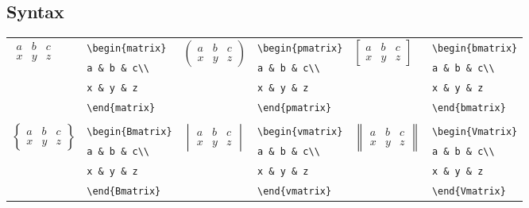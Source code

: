 \documentclass[10pt, english]{article}
\begin{document}
	\subsection{Syntax}

	\begin{center}
		\scriptsize
	\begin{tabular}{ll|ll|ll}
		\multirow{4}{*}{$\begin{matrix}a&b&c\\x&y&z\end{matrix}$} & \verb|\begin{matrix}| & \multirow{4}{*}{$\begin{pmatrix}a&b&c\\x&y&z\end{pmatrix}$} & \verb|\begin{pmatrix}| & \multirow{4}{*}{$\begin{bmatrix}a&b&c\\x&y&z\end{bmatrix}$} & \verb|\begin{bmatrix}|\\ 
		& \verb|a & b & c\\| & & \verb|a & b & c\\| & & \verb|a & b & c\\|\\ 
		& \verb|x & y & z| & & \verb|x & y & z| & & \verb|x & y & z|\\ 
		& \verb|\end{matrix}| & & \verb|\end{pmatrix}| & & \verb|\end{bmatrix}|\\
		\multicolumn{2}{l|}{} & \multicolumn{2}{l|}{} & \multicolumn{2}{l}{}\\
                \multirow{4}{*}{$\begin{Bmatrix}a&b&c\\x&y&z\end{Bmatrix}$} & \verb|\begin{Bmatrix}| & \multirow{4}{*}{$\begin{vmatrix}a&b&c\\x&y&z\end{vmatrix}$} & \verb|\begin{vmatrix}| & \multirow{4}{*}{$\begin{Vmatrix}a&b&c\\x&y&z\end{Vmatrix}$} & \verb|\begin{Vmatrix}|\\
                & \verb|a & b & c\\| & & \verb|a & b & c\\| & & \verb|a & b & c\\|\\
                & \verb|x & y & z| & & \verb|x & y & z| & & \verb|x & y & z|\\
                & \verb|\end{Bmatrix}| & & \verb|\end{vmatrix}| & & \verb|\end{Vmatrix}|\\
	\end{tabular}
	\end{center}
\end{document}
